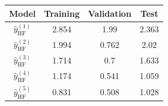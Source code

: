 \begin{tabular}{cccc}
\toprule
Model & Training & Validation & Test \\
\midrule
$\hat{y}_\text{HF}^{(1)}$ & 2.854 & 1.99 & 2.363 \\
$\hat{y}_\text{HF}^{(2)}$ & 1.994 & 0.762 & 2.02 \\
$\hat{y}_\text{HF}^{(3)}$ & 1.714 & 0.7 & 1.633 \\
$\hat{y}_\text{HF}^{(4)}$ & 1.174 & 0.541 & 1.059 \\
$\hat{y}_\text{HF}^{(5)}$ & 0.831 & 0.508 & 1.028 \\
\bottomrule
\end{tabular}
